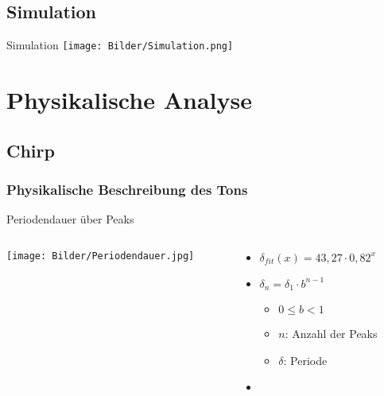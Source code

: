 \documentclass[12pt]{beamer}
\begin{document}
\subsection{Simulation}
\begin{frame}{Simulation}
\texttt{[image: Bilder/Simulation.png]}
\end{frame}
\section{Physikalische Analyse}
\subsection{Chirp}
\subsubsection{Physikalische Beschreibung des Tons}

\begin{frame}{Periodendauer über Peaks}
\begin{columns}
\begin{column}{.55\textwidth}
	\texttt{[image: Bilder/Periodendauer.jpg]}
\end{column}
\begin{column}{.45\textwidth}
	\begin{itemize}
	\item<1-> $\delta_{fit}(x)=43,27\cdot 0,82^x$
	\item<2-> $\delta_n=\delta_1\cdot b^{n-1}$
		\begin{itemize}
		\item $0\leq b<1$
		\item $n$: Anzahl der Peaks
		\item $\delta$: Periode
		\end{itemize}
	\item[ ] \ %
	\end{itemize}
\end{column}
\end{columns}
\end{frame}
\end{document}
